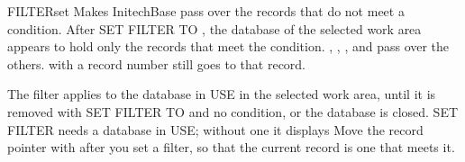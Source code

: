 \begin{XbaseEntry}{FILTER}{set}
Makes InitechBase pass over the records that do not meet a condition.
\Syntax
{}
\Usage
After SET FILTER TO , the database of the selected work area
appears to hold only the records that meet the condition.  ,
, ,  and  pass over the others.
 with a record number still goes to that record.

The filter applies to the database in USE in the selected work area, until it
is removed with SET FILTER TO and no condition, or the database is closed.
SET FILTER needs a database in USE; without one it displays
\Tips
Move the record pointer with  after you set a filter, so that the
current record is one that meets it.
\Examples
{}
\end{XbaseEntry}

